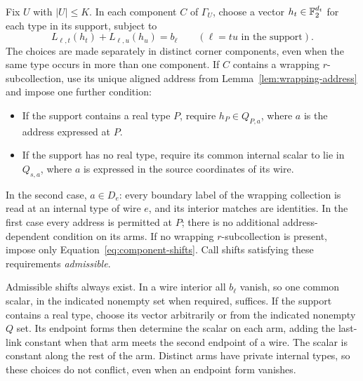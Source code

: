 Fix $U$ with $|U|\leq K$. In each component $C$ of $\Gamma_U$, choose
a vector $h_t\in\mathbb F_2^{d_t}$ for each type in its support, subject to
\begin{equation}
  L_{\ell,t}(h_t)+L_{\ell,u}(h_u)=b_\ell
  \qquad(\ell=tu\text{ in the support}).
  \label{eq:component-shifts}
\end{equation}
The choices are made separately in distinct corner components, even
when the same type occurs in more than one component. If $C$ contains
a wrapping $r$-subcollection, use its unique aligned address from
Lemma~\ref{lem:wrapping-address} and impose one further condition:
\begin{itemize}
\item If the support contains a real type $P$, require
$h_P\in Q_{P,a}$, where $a$ is the address expressed at $P$.
\item If the support has no real type, require its common internal
scalar to lie in $Q_{s,a}$, where $a$ is expressed in the source
coordinates of its wire.
\end{itemize}
In the second case, $a\in D_e$: every boundary label of the wrapping
collection is read at an internal type of wire $e$, and its interior
matches are identities. In the first case every address is permitted
at $P$; there is no additional address-dependent condition on its arms.
If no wrapping $r$-subcollection is present, impose only
Equation~\eqref{eq:component-shifts}. Call shifts satisfying these
requirements \emph{admissible}.

Admissible shifts always exist. In a wire interior all $b_\ell$ vanish,
so one common scalar, in the indicated nonempty set when required,
suffices. If the support contains a real type, choose its vector
arbitrarily or from the indicated nonempty $Q$ set. Its endpoint forms
then determine the scalar on each arm, adding the last-link constant
when that arm meets the second endpoint of a wire. The scalar is
constant along the rest of the arm. Distinct arms have private internal
types, so these choices do not conflict, even when an endpoint form
vanishes.

